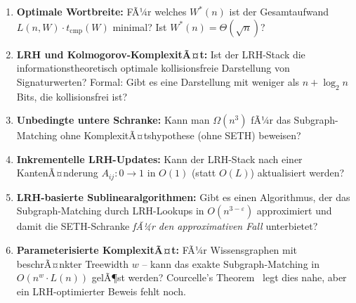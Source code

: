 ﻿\documentclass[a4paper,12pt]{article}
\theoremstyle{definition}
\begin{document}
\begin{enumerate}
  \item \textbf{Optimale Wortbreite:} FÃ¼r welches $W^*(n)$ ist der Gesamtaufwand
        $L(n,W) \cdot t_{\mathrm{cmp}}(W)$ minimal? Ist $W^*(n) = \Theta(\sqrt{n})$?

  \item \textbf{LRH und Kolmogorov-KomplexitÃ¤t:} Ist der LRH-Stack die
        informationstheoretisch optimale kollisionsfreie Darstellung von
        Signaturwerten? Formal: Gibt es eine Darstellung mit weniger als
        $n + \log_2 n$ Bits, die kollisionsfrei ist?

  \item \textbf{Unbedingte untere Schranke:} Kann man $\Omega(n^3)$ fÃ¼r das
        Subgraph-Matching ohne KomplexitÃ¤tshypothese (ohne SETH) beweisen?

  \item \textbf{Inkrementelle LRH-Updates:} Kann der LRH-Stack nach einer
        KantenÃ¤nderung $A_{ij}: 0 \to 1$ in $O(1)$ (statt $O(L)$) aktualisiert werden?

  \item \textbf{LRH-basierte Sublinearalgorithmen:} Gibt es einen Algorithmus,
        der das Subgraph-Matching durch LRH-Lookups in $O(n^{3-\varepsilon})$
        approximiert und damit die SETH-Schranke \emph{fÃ¼r den approximativen Fall}
        unterbietet?

  \item \textbf{Parameterisierte KomplexitÃ¤t:} FÃ¼r Wissensgraphen mit beschrÃ¤nkter
        Treewidth $w$ -- kann das exakte Subgraph-Matching in $O(n^w \cdot L(n))$
        gelÃ¶st werden? Courcelle's Theorem~\cite{courcelle1990} legt dies nahe, aber
        ein LRH-optimierter Beweis fehlt noch.
\end{enumerate}
\end{document}
